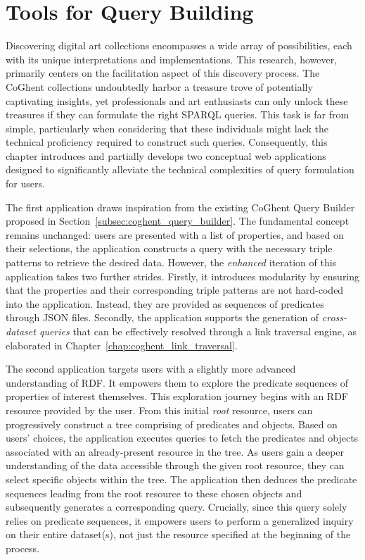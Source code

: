 \chapter{Tools for Query Building}
\label{chap:tools_query_building}

Discovering digital art collections encompasses a wide array of possibilities, each with its unique interpretations and implementations. This research, however, primarily centers on the facilitation aspect of this discovery process. The CoGhent collections undoubtedly harbor a treasure trove of potentially captivating insights, yet professionals and art enthusiasts can only unlock these treasures if they can formulate the right SPARQL queries. This task is far from simple, particularly when considering that these individuals might lack the technical proficiency required to construct such queries. Consequently, this chapter introduces and partially develops two conceptual web applications designed to significantly alleviate the technical complexities of query formulation for users.

The first application draws inspiration from the existing CoGhent Query Builder proposed in Section~\ref{subsec:coghent_query_builder}. The fundamental concept remains unchanged: users are presented with a list of properties, and based on their selections, the application constructs a query with the necessary triple patterns to retrieve the desired data. However, the \textit{enhanced} iteration of this application takes two further strides. Firstly, it introduces modularity by ensuring that the properties and their corresponding triple patterns are not hard-coded into the application. Instead, they are provided as sequences of predicates through JSON files. Secondly, the application supports the generation of \textit{cross-dataset queries} that can be effectively resolved through a link traversal engine, as elaborated in Chapter~\ref{chap:coghent_link_traversal}.

The second application targets users with a slightly more advanced understanding of RDF. It empowers them to explore the predicate sequences of properties of interest themselves. This exploration journey begins with an RDF resource provided by the user. From this initial \textit{root} resource, users can progressively construct a tree comprising of predicates and objects. Based on users' choices, the application executes queries to fetch the predicates and objects associated with an already-present resource in the tree. As users gain a deeper understanding of the data accessible through the given root resource, they can select specific objects within the tree. The application then deduces the predicate sequences leading from the root resource to these chosen objects and subsequently generates a corresponding query. Crucially, since this query solely relies on predicate sequences, it empowers users to perform a generalized inquiry on their entire dataset(s), not just the resource specified at the beginning of the process.

